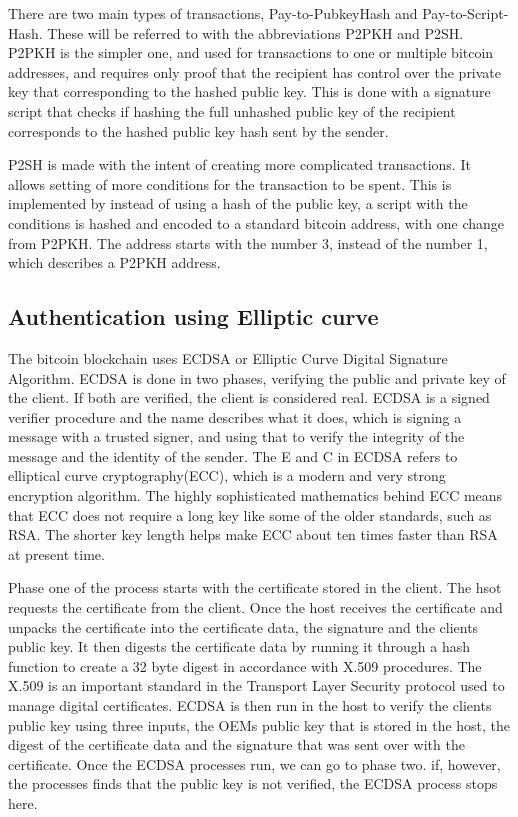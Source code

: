 \documentclass[11pt]{article}
\begin{document}
There are two main types of transactions, Pay-to-PubkeyHash and Pay-to-Script-Hash. These will be referred to with the abbreviations P2PKH and P2SH. P2PKH is the simpler one, and used for transactions to one or multiple bitcoin addresses, and requires only proof that the recipient has control over the private key that corresponding to the hashed public key. This is done with a signature script that checks if hashing the full unhashed public key of the recipient corresponds to the hashed public key hash sent by the sender.

P2SH is made with the intent of creating more complicated transactions. It allows setting of more conditions for the transaction to be spent. This is implemented by instead of using a hash of the public key, a script with the conditions is hashed and encoded to a standard bitcoin address, with one change from P2PKH. The address starts with the number 3, instead of the number 1, which describes a P2PKH address. 

\subsection{Authentication using Elliptic curve}
The bitcoin blockchain uses ECDSA or Elliptic Curve Digital Signature Algorithm. ECDSA is done in two phases, verifying the public and private key of the client. If both are verified, the client is considered real. ECDSA is a signed verifier procedure and the name describes what it does, which is signing a message with a trusted signer, and using that to verify the integrity of the message and the identity of the sender. The E and C in ECDSA refers to elliptical curve cryptography(ECC), which is a modern and very strong encryption algorithm. The highly sophisticated mathematics behind ECC means that ECC does not require a long key like some of the older standards, such as RSA. The shorter key length helps make ECC about ten times faster than RSA\cite{jansma2004performance} at present time. 

Phase one of the process starts with the certificate stored in the client. The hsot requests the certificate from the client. Once the host receives the certificate and unpacks the certificate into the certificate data, the signature and the clients public key. It then digests the certificate data by running it through a hash function to create a 32 byte digest in accordance with X.509 procedures. The X.509 is an important standard in the Transport Layer Security protocol used to manage digital certificates. ECDSA is then run in the host to verify the clients public key using three inputs, the OEMs public key that is stored in the host, the digest of the certificate data and the signature that was sent over with the certificate. Once the ECDSA processes run, we can go to phase two. if, however, the processes finds that the public key is not verified, the ECDSA process stops here.
\end{document}
